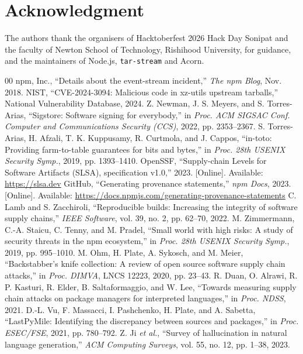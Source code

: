 \documentclass[conference]{IEEEtran}
\newcommand{\code}[1]{\texttt{#1}}
\begin{document}
\section*{Acknowledgment}
The authors thank the organisers of Hacktoberfest 2026 Hack Day Sonipat and the
faculty of Newton School of Technology, Rishihood University, for guidance, and
the maintainers of Node.js, \code{tar-stream} and Acorn.

\begin{thebibliography}{00}
 npm, Inc., ``Details about the event-stream incident,'' \emph{The npm Blog}, Nov. 2018.
 NIST, ``CVE-2024-3094: Malicious code in xz-utils upstream tarballs,'' National Vulnerability Database, 2024.
 Z. Newman, J. S. Meyers, and S. Torres-Arias, ``Sigstore: Software signing for everybody,'' in \emph{Proc. ACM SIGSAC Conf. Computer and Communications Security (CCS)}, 2022, pp. 2353--2367.
 S. Torres-Arias, H. Afzali, T. K. Kuppusamy, R. Curtmola, and J. Cappos, ``in-toto: Providing farm-to-table guarantees for bits and bytes,'' in \emph{Proc. 28th USENIX Security Symp.}, 2019, pp. 1393--1410.
 OpenSSF, ``Supply-chain Levels for Software Artifacts (SLSA), specification v1.0,'' 2023. [Online]. Available: \url{https://slsa.dev}
 GitHub, ``Generating provenance statements,'' \emph{npm Docs}, 2023. [Online]. Available: \url{https://docs.npmjs.com/generating-provenance-statements}
 C. Lamb and S. Zacchiroli, ``Reproducible builds: Increasing the integrity of software supply chains,'' \emph{IEEE Software}, vol. 39, no. 2, pp. 62--70, 2022.
 M. Zimmermann, C.-A. Staicu, C. Tenny, and M. Pradel, ``Small world with high risks: A study of security threats in the npm ecosystem,'' in \emph{Proc. 28th USENIX Security Symp.}, 2019, pp. 995--1010.
 M. Ohm, H. Plate, A. Sykosch, and M. Meier, ``Backstabber's knife collection: A review of open source software supply chain attacks,'' in \emph{Proc. DIMVA}, LNCS 12223, 2020, pp. 23--43.
 R. Duan, O. Alrawi, R. P. Kasturi, R. Elder, B. Saltaformaggio, and W. Lee, ``Towards measuring supply chain attacks on package managers for interpreted languages,'' in \emph{Proc. NDSS}, 2021.
 D.-L. Vu, F. Massacci, I. Pashchenko, H. Plate, and A. Sabetta, ``LastPyMile: Identifying the discrepancy between sources and packages,'' in \emph{Proc. ESEC/FSE}, 2021, pp. 780--792.
 Z. Ji \emph{et al.}, ``Survey of hallucination in natural language generation,'' \emph{ACM Computing Surveys}, vol. 55, no. 12, pp. 1--38, 2023.

\end{thebibliography}
\end{document}
